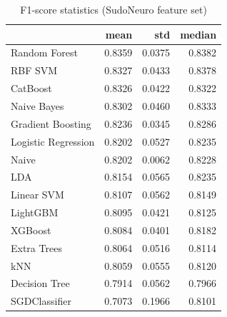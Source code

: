 \begin{table}
\caption{F1-score statistics (SudoNeuro feature set)}
\label{tab:f1_SudoNeuro_stats}
\begin{tabular}{lrrr}
\toprule
 & mean & std & median \\
\midrule
Random Forest & 0.8359 & 0.0375 & 0.8382 \\
RBF SVM & 0.8327 & 0.0433 & 0.8378 \\
CatBoost & 0.8326 & 0.0422 & 0.8322 \\
Naive Bayes & 0.8302 & 0.0460 & 0.8333 \\
Gradient Boosting & 0.8236 & 0.0345 & 0.8286 \\
Logistic Regression & 0.8202 & 0.0527 & 0.8235 \\
Naive & 0.8202 & 0.0062 & 0.8228 \\
LDA & 0.8154 & 0.0565 & 0.8235 \\
Linear SVM & 0.8107 & 0.0562 & 0.8149 \\
LightGBM & 0.8095 & 0.0421 & 0.8125 \\
XGBoost & 0.8084 & 0.0401 & 0.8182 \\
Extra Trees & 0.8064 & 0.0516 & 0.8114 \\
kNN & 0.8059 & 0.0555 & 0.8120 \\
Decision Tree & 0.7914 & 0.0562 & 0.7966 \\
SGDClassifier & 0.7073 & 0.1966 & 0.8101 \\
\bottomrule
\end{tabular}
\end{table}
